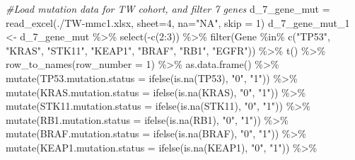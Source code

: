 \documentclass[
]{article}
\newenvironment{Shaded}{\begin{snugshade}}{\end{snugshade}}
\newcommand{\AttributeTok}[1]{\textcolor[rgb]{0.77,0.63,0.00}{#1}}
\newcommand{\CommentTok}[1]{\textcolor[rgb]{0.56,0.35,0.01}{\textit{#1}}}
\newcommand{\DecValTok}[1]{\textcolor[rgb]{0.00,0.00,0.81}{#1}}
\newcommand{\FunctionTok}[1]{\textcolor[rgb]{0.00,0.00,0.00}{#1}}
\newcommand{\NormalTok}[1]{#1}
\newcommand{\OtherTok}[1]{\textcolor[rgb]{0.56,0.35,0.01}{#1}}
\newcommand{\SpecialCharTok}[1]{\textcolor[rgb]{0.00,0.00,0.00}{#1}}
\newcommand{\StringTok}[1]{\textcolor[rgb]{0.31,0.60,0.02}{#1}}
\begin{document}
\begin{Shaded}
\begin{Highlighting}[]
\CommentTok{\#Load mutation data for TW cohort, and filter 7 genes}
\NormalTok{d\_7\_gene\_mut }\OtherTok{=} \FunctionTok{read\_excel}\NormalTok{(}\StringTok{\textquotesingle{}./TW{-}mmc1.xlsx\textquotesingle{}}\NormalTok{, }\AttributeTok{sheet=}\DecValTok{4}\NormalTok{, }\AttributeTok{na=}\StringTok{"NA"}\NormalTok{, }\AttributeTok{skip =} \DecValTok{1}\NormalTok{)}
\NormalTok{d\_7\_gene\_mut\_1 }\OtherTok{\textless{}{-}}\NormalTok{ d\_7\_gene\_mut }\SpecialCharTok{\%\textgreater{}\%} 
  \FunctionTok{select}\NormalTok{(}\SpecialCharTok{{-}}\FunctionTok{c}\NormalTok{(}\DecValTok{2}\SpecialCharTok{:}\DecValTok{3}\NormalTok{)) }\SpecialCharTok{\%\textgreater{}\%} 
  \FunctionTok{filter}\NormalTok{(Gene }\SpecialCharTok{\%in\%} \FunctionTok{c}\NormalTok{(}\StringTok{"TP53"}\NormalTok{, }\StringTok{"KRAS"}\NormalTok{, }\StringTok{"STK11"}\NormalTok{, }\StringTok{"KEAP1"}\NormalTok{, }\StringTok{"BRAF"}\NormalTok{, }\StringTok{"RB1"}\NormalTok{, }\StringTok{"EGFR"}\NormalTok{)) }\SpecialCharTok{\%\textgreater{}\%}
  \FunctionTok{t}\NormalTok{() }\SpecialCharTok{\%\textgreater{}\%}
  \FunctionTok{row\_to\_names}\NormalTok{(}\AttributeTok{row\_number =} \DecValTok{1}\NormalTok{) }\SpecialCharTok{\%\textgreater{}\%}
  \FunctionTok{as.data.frame}\NormalTok{() }\SpecialCharTok{\%\textgreater{}\%}
  \FunctionTok{mutate}\NormalTok{(}\AttributeTok{TP53.mutation.status =} \FunctionTok{ifelse}\NormalTok{(}\FunctionTok{is.na}\NormalTok{(TP53), }\StringTok{"0"}\NormalTok{, }\StringTok{"1"}\NormalTok{)) }\SpecialCharTok{\%\textgreater{}\%}
  \FunctionTok{mutate}\NormalTok{(}\AttributeTok{KRAS.mutation.status =} \FunctionTok{ifelse}\NormalTok{(}\FunctionTok{is.na}\NormalTok{(KRAS), }\StringTok{"0"}\NormalTok{, }\StringTok{"1"}\NormalTok{)) }\SpecialCharTok{\%\textgreater{}\%}
  \FunctionTok{mutate}\NormalTok{(}\AttributeTok{STK11.mutation.status =} \FunctionTok{ifelse}\NormalTok{(}\FunctionTok{is.na}\NormalTok{(STK11), }\StringTok{"0"}\NormalTok{, }\StringTok{"1"}\NormalTok{)) }\SpecialCharTok{\%\textgreater{}\%}
  \FunctionTok{mutate}\NormalTok{(}\AttributeTok{RB1.mutation.status =} \FunctionTok{ifelse}\NormalTok{(}\FunctionTok{is.na}\NormalTok{(RB1), }\StringTok{"0"}\NormalTok{, }\StringTok{"1"}\NormalTok{)) }\SpecialCharTok{\%\textgreater{}\%}
  \FunctionTok{mutate}\NormalTok{(}\AttributeTok{BRAF.mutation.status =} \FunctionTok{ifelse}\NormalTok{(}\FunctionTok{is.na}\NormalTok{(BRAF), }\StringTok{"0"}\NormalTok{, }\StringTok{"1"}\NormalTok{)) }\SpecialCharTok{\%\textgreater{}\%}
  \FunctionTok{mutate}\NormalTok{(}\AttributeTok{KEAP1.mutation.status =} \FunctionTok{ifelse}\NormalTok{(}\FunctionTok{is.na}\NormalTok{(KEAP1), }\StringTok{"0"}\NormalTok{, }\StringTok{"1"}\NormalTok{)) }\SpecialCharTok{\%\textgreater{}\%}

\end{Highlighting}
\end{Shaded}
\end{document}
